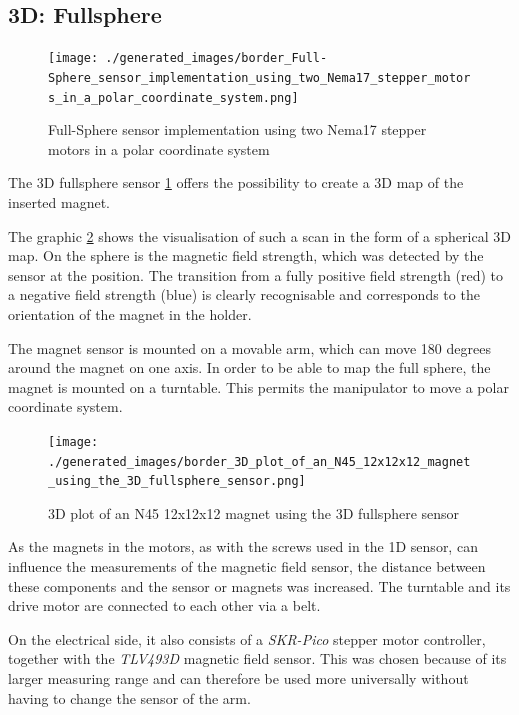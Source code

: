 \hypertarget{d-fullsphere}{%
\subsection{3D: Fullsphere}\label{d-fullsphere}}

\begin{figure}
\centering
\texttt{[image: ./generated\_images/border\_Full-Sphere\_sensor\_implementation\_using\_two\_Nema17\_stepper\_motors\_in\_a\_polar\_coordinate\_system.png]}
\caption{Full-Sphere sensor implementation using two Nema17 stepper
motors in a polar coordinate system
\label{Full-Sphere_sensor_implementation_using_two_Nema17_stepper_motors_in_a_polar_coordinate_system.png}}
\end{figure}

The 3D fullsphere sensor
\ref{Full-Sphere_sensor_implementation_using_two_Nema17_stepper_motors_in_a_polar_coordinate_system.png}
offers the possibility to create a 3D map of the inserted magnet.

The graphic
\ref{3D_plot_of_an_N45_12x12x12_magnet_using_the_3D_fullsphere_sensor.png}
shows the visualisation of such a scan in the form of a spherical 3D
map. On the sphere is the magnetic field strength, which was detected by
the sensor at the position. The transition from a fully positive field
strength (red) to a negative field strength (blue) is clearly
recognisable and corresponds to the orientation of the magnet in the
holder.

The magnet sensor is mounted on a movable arm, which can move 180
degrees around the magnet on one axis. In order to be able to map the
full sphere, the magnet is mounted on a turntable. This permits the
manipulator to move a polar coordinate system.

\begin{figure}
\centering
\texttt{[image: ./generated\_images/border\_3D\_plot\_of\_an\_N45\_12x12x12\_magnet\_using\_the\_3D\_fullsphere\_sensor.png]}
\caption{3D plot of an N45 12x12x12 magnet using the 3D fullsphere
sensor
\label{3D_plot_of_an_N45_12x12x12_magnet_using_the_3D_fullsphere_sensor.png}}
\end{figure}

As the magnets in the motors, as with the screws used in the 1D sensor,
can influence the measurements of the magnetic field sensor, the
distance between these components and the sensor or magnets was
increased. The turntable and its drive motor are connected to each other
via a belt.

On the electrical side, it also consists of a \emph{SKR-Pico} stepper
motor controller, together with the \emph{TLV493D} magnetic field
sensor. This was chosen because of its larger measuring range and can
therefore be used more universally without having to change the sensor
of the arm.

